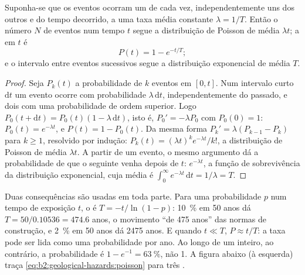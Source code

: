 \begin{proposition}\label{prop:b2:geological-hazards:poisson}
Suponha-se que os eventos ocorram um de cada vez, independentemente uns
dos outros e do tempo decorrido, a uma taxa média constante $\lambda = 1/T$. Então o número $N$ de
eventos num tempo $t$ segue a distribuição de Poisson de média $\lambda t$; a 
em $t$ é
\begin{equation}
P(t) = 1 - e^{-t/T};
\label{eq:b2:geological-hazards:poisson}
\end{equation}
e o intervalo entre eventos sucessivos segue a distribuição exponencial de média $T$.
\end{proposition}

\begin{proof}
Seja $P_k(t)$ a probabilidade de $k$ eventos em $[0, t]$. Num intervalo curto $\mathrm{d}t$ um
evento ocorre com probabilidade $\lambda\,\mathrm{d}t$, independentemente do passado, e dois com uma
probabilidade de ordem superior. Logo $P_0(t + \mathrm{d}t) = P_0(t)(1 - \lambda\,\mathrm{d}t)$, isto é,
$P_0' = -\lambda P_0$ com $P_0(0) = 1$: $P_0(t) = e^{-\lambda t}$, e $P(t) = 1 - P_0(t)$. Da
mesma forma $P_k' = \lambda(P_{k-1} - P_k)$ para $k \geq 1$, resolvido por indução:
$P_k(t) = (\lambda t)^k e^{-\lambda t}/k!$, a distribuição de Poisson de média $\lambda t$. A partir de
um evento, o mesmo argumento dá a probabilidade de que o seguinte venha depois de $t$:
$e^{-\lambda t}$, a função de sobrevivência da distribuição exponencial, cuja média é
$\int_0^\infty e^{-\lambda t}\,\mathrm{d}t = 1/\lambda = T$.
\end{proof}

Duas consequências são usadas em toda parte. Para uma probabilidade $p$ num tempo de exposição $t$, o  é $T = -t/\ln(1 - p)$: \qty{10}{\percent} em 50 anos dá $T = 50/0.10536 =
474.6$ anos, o movimento ``de 475 anos'' das normas de construção, e \qty{2}{\percent} em 50 anos
dá 2475 anos. E quando $t \ll T$, $P \approx t/T$: a taxa pode ser lida como uma
probabilidade por ano. Ao longo de um  inteiro, ao contrário, a probabilidade é $1 - e^{-1} =
\qty{63}{\percent}$, não 1. A figura abaixo (à esquerda) traça \eqref{eq:b2:geological-hazards:poisson}
para três .

